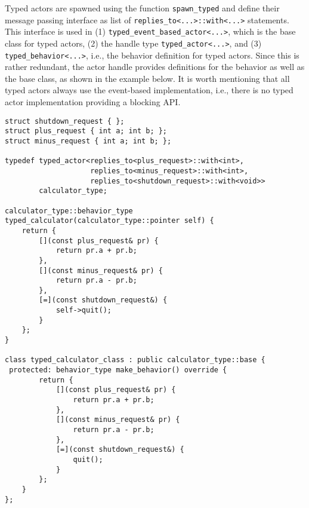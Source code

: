 Typed actors are spawned using the function \lstinline^spawn_typed^ and define their message passing interface as list of \lstinline^replies_to<...>::with<...>^ statements.
This interface is used in (1) \lstinline^typed_event_based_actor<...>^, which is the base class for typed actors, (2) the handle type \lstinline^typed_actor<...>^, and (3) \lstinline^typed_behavior<...>^, i.e., the behavior definition for typed actors.
Since this is rather redundant, the actor handle provides definitions for the behavior as well as the base class, as shown in the example below.
It is worth mentioning that all typed actors always use the event-based implementation, i.e., there is no typed actor implementation providing a blocking API.

\begin{lstlisting}
struct shutdown_request { };
struct plus_request { int a; int b; };
struct minus_request { int a; int b; };

typedef typed_actor<replies_to<plus_request>::with<int>,
                    replies_to<minus_request>::with<int>,
                    replies_to<shutdown_request>::with<void>>
        calculator_type;

calculator_type::behavior_type
typed_calculator(calculator_type::pointer self) {
    return {
        [](const plus_request& pr) {
            return pr.a + pr.b;
        },
        [](const minus_request& pr) {
            return pr.a - pr.b;
        },
        [=](const shutdown_request&) {
            self->quit();
        }
    };
}

class typed_calculator_class : public calculator_type::base {
 protected: behavior_type make_behavior() override {
        return {
            [](const plus_request& pr) {
                return pr.a + pr.b;
            },
            [](const minus_request& pr) {
                return pr.a - pr.b;
            },
            [=](const shutdown_request&) {
                quit();
            }
        };
    }
};
\end{lstlisting}

